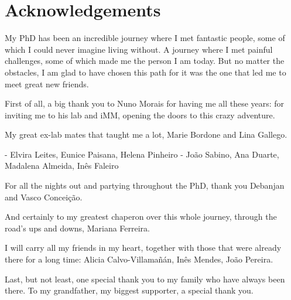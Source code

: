 
\chapter*{Acknowledgements}
My PhD has been an incredible journey where I met fantastic people, some of which I could never imagine living without. A journey where I met painful challenges, some of which made me the person I am today. But no matter the obstacles, I am glad to have chosen this path for it was the one that led me to meet great new friends.

First of all, a big thank you to Nuno Morais for having me all these years: for inviting me to his lab and iMM, opening the doors to this crazy adventure.

My great ex-lab mates that taught me a lot, Marie Bordone and Lina Gallego.

- Elvira Leites, Eunice Paisana, Helena Pinheiro
- João Sabino, Ana Duarte, Madalena Almeida, Inês Faleiro

For all the nights out and partying throughout the PhD, thank you Debanjan and Vasco Conceição.

And certainly to my greatest chaperon over this whole journey, through the road's ups and downs, Mariana Ferreira.

I will carry all my friends in my heart, together with those that were already there for a long time: Alicia Calvo-Villamañán, Inês Mendes, João Pereira.

Last, but not least, one special thank you to my family who have always been there. To my grandfather, my biggest supporter, a special thank you.